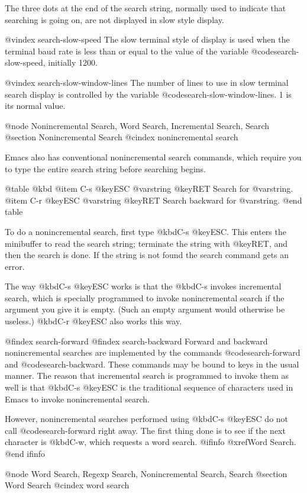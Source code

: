 {{{{{{{{  The three dots at the end of the search string, normally used to indicate
that searching is going on, are not displayed in slow style display.

@vindex search-slow-speed
  The slow terminal style of display is used when the terminal baud rate is
less than or equal to the value of the variable @code{search-slow-speed},
initially 1200.

@vindex search-slow-window-lines
  The number of lines to use in slow terminal search display is controlled
by the variable @code{search-slow-window-lines}.  1 is its normal value.

@node Nonincremental Search, Word Search, Incremental Search, Search
@section Nonincremental Search
@cindex nonincremental search

  Emacs also has conventional nonincremental search commands, which require
you to type the entire search string before searching begins.

@table @kbd
@item C-s @key{ESC} @var{string} @key{RET}
Search for @var{string}.
@item C-r @key{ESC} @var{string} @key{RET}
Search backward for @var{string}.
@end table

  To do a nonincremental search, first type @kbd{C-s @key{ESC}}.  This
enters the minibuffer to read the search string; terminate the string with
@key{RET}, and then the search is done.  If the string is not found the
search command gets an error.

  The way @kbd{C-s @key{ESC}} works is that the @kbd{C-s} invokes
incremental search, which is specially programmed to invoke nonincremental
search if the argument you give it is empty.  (Such an empty argument would
otherwise be useless.)  @kbd{C-r @key{ESC}} also works this way.

@findex search-forward
@findex search-backward
  Forward and backward nonincremental searches are implemented by the
commands @code{search-forward} and @code{search-backward}.  These commands
may be bound to keys in the usual manner.  The reason that incremental
search is programmed to invoke them as well is that @kbd{C-s @key{ESC}}
is the traditional sequence of characters used in Emacs to invoke
nonincremental search.

  However, nonincremental searches performed using @kbd{C-s @key{ESC}} do
not call @code{search-forward} right away.  The first thing done is to see
if the next character is @kbd{C-w}, which requests a word search.
@ifinfo
@xref{Word Search}.
@end ifinfo

@node Word Search, Regexp Search, Nonincremental Search, Search
@section Word Search
@cindex word search

}}}}}}}}
